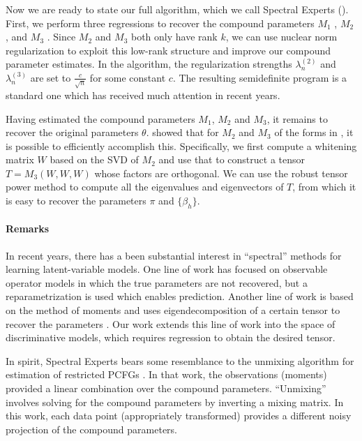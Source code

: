 Now we are ready to state our full algorithm, which we call Spectral Experts
().
First, we perform three regressions to recover the compound parameters
$M_1$ ,
$M_2$ , and
$M_3$ .
Since $M_2$ and $M_3$ both only have rank $k$,
we can use nuclear norm regularization
\cite{Tomioka2011,NegahbanWainwright2009}
to exploit this low-rank structure and improve our compound parameter estimates.
In the algorithm, the regularization strengths $\lambda_n^{(2)}$ and $\lambda_n^{(3)}$
are set to $\frac{c}{\sqrt{n}}$ for some constant $c$.
The resulting semidefinite program is a standard one which has received
much attention in recent years.

Having estimated the compound parameters $M_1$, $M_2$ and $M_3$, it
remains to recover the original parameters $\theta$.
\citet{AnandkumarGeHsu2012} showed that for $M_2$ and $M_3$ of
the forms in , it is possible to efficiently accomplish this.
Specifically, we first compute a whitening matrix $W$ based on the SVD of $M_2$
and use that to construct a tensor $T = M_3(W, W, W)$ whose factors are orthogonal.
We can use the robust tensor power method to compute all the
eigenvalues and eigenvectors of $T$, from which it is easy to recover
the parameters $\pi$ and $\{\beta_h\}$.

\paragraph{Remarks}

In recent years, there has a been substantial interest in ``spectral'' methods
for learning latent-variable models.  One line of work has
focused on observable operator models \cite{hsu09spectral}
in which the true parameters are not recovered, but a reparametrization is used
which enables prediction.
Another line of work is based on the method of moments and uses eigendecomposition of a certain tensor
to recover the parameters \cite{anandkumar12lda,anandkumar12moments}.
Our work extends this line of work into the space of discriminative models,
which requires regression to obtain the desired tensor.

In spirit, Spectral Experts bears some resemblance to the unmixing
algorithm for estimation of restricted PCFGs
\cite{hsu12identifiability}.
In that work, the observations (moments) provided a linear combination over
the compound parameters.  ``Unmixing'' involves solving for the compound
parameters by inverting a mixing matrix.  In this work,
each data point (appropriately transformed) provides a different noisy projection of
the compound parameters.


